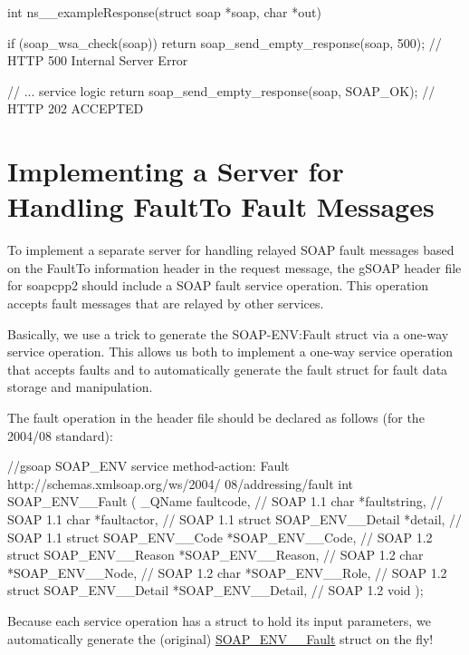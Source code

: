 \begin{DoxyCode}
int ns__exampleResponse(struct soap *soap, char *out)
{ if (soap_wsa_check(soap))
    return soap_send_empty_response(soap, 500); // HTTP 500 Internal Server Error
      
  // ... service logic
  return soap_send_empty_response(soap, SOAP_OK); // HTTP 202 ACCEPTED
}
\end{DoxyCode}
\hypertarget{wsa__0_wsa_6}{}\section{Implementing a Server for Handling FaultTo Fault Messages}\label{wsa__0_wsa_6}
To implement a separate server for handling relayed SOAP fault messages based on the FaultTo information header in the request message, the gSOAP header file for soapcpp2 should include a SOAP fault service operation. This operation accepts fault messages that are relayed by other services.

Basically, we use a trick to generate the SOAP-\/ENV:Fault struct via a one-\/way service operation. This allows us both to implement a one-\/way service operation that accepts faults and to automatically generate the fault struct for fault data storage and manipulation.

The fault operation in the header file should be declared as follows (for the 2004/08 standard):


\begin{DoxyCode}
//gsoap SOAP_ENV service method-action: Fault http://schemas.xmlsoap.org/ws/2004/
      08/addressing/fault
int SOAP_ENV__Fault
(       _QName                   faultcode,             // SOAP 1.1
        char                    *faultstring,           // SOAP 1.1
        char                    *faultactor,            // SOAP 1.1
        struct SOAP_ENV__Detail *detail,                // SOAP 1.1
        struct SOAP_ENV__Code   *SOAP_ENV__Code,        // SOAP 1.2
        struct SOAP_ENV__Reason *SOAP_ENV__Reason,      // SOAP 1.2
        char                    *SOAP_ENV__Node,        // SOAP 1.2
        char                    *SOAP_ENV__Role,        // SOAP 1.2
        struct SOAP_ENV__Detail *SOAP_ENV__Detail,      // SOAP 1.2
        void
);
\end{DoxyCode}


Because each service operation has a struct to hold its input parameters, we automatically generate the (original) \hyperlink{structSOAP__ENV____Fault}{SOAP\_\-ENV\_\-\_\-Fault} struct on the fly!

